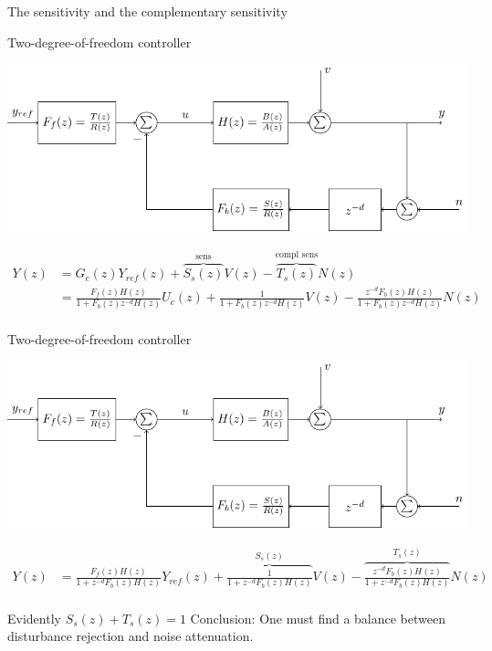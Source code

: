 \documentclass[presentation,aspectratio=169]{beamer}
\begin{document}
\begin{frame}[label={sec:orge304fac}]{The sensitivity and the complementary sensitivity}
\end{frame}
\begin{frame}[label={sec:org9f204b3}]{Two-degree-of-freedom controller}
\begin{center}
\includegraphics[width=0.8\linewidth]{../../figures/2dof-block-explicit}
\end{center}

\begin{align*}
Y(z) &= G_c(z)Y_{ref}(z) + \overbrace{S_s(z)}^{\text{sens}}V(z) - \overbrace{T_s(z)}^{\text{compl sens}}N(z)\\
     &= \frac{F_f(z)H(z)}{1 + F_b(z)z^{-d}H(z)}U_c(z) + \frac{1}{1 + F_b(z)z^{-d}H(z)}V(z)  - \frac{z^{-d}F_b(z)H(z)}{1 + F_b(z)z^{-d}H(z)}N(z)\\
\end{align*}
\end{frame}

\begin{frame}[label={sec:org803888e}]{Two-degree-of-freedom controller}
\begin{center}
\includegraphics[width=0.7\linewidth]{../../figures/2dof-block-explicit}
\end{center}

\begin{align*}
Y(z)     &= \frac{F_f(z)H(z)}{1 + z^{-d}F_b(z)H(z)}Y_{ref}(z) + \overbrace{\frac{1}{1 + z^{-d}F_b(z)H(z)}}^{S_s(z)}V(z)  - \overbrace{\frac{z^{-d}F_b(z)H(z)}{1 + z^{-d}F_b(z)H(z)}}^{T_s(z)}N(z)\\
\end{align*}

\alert{Evidently} \(S_s(z) + T_s(z) = 1\) \alert{Conclusion:} One must find a balance between disturbance rejection and noise attenuation.
\end{frame}
\end{document}

